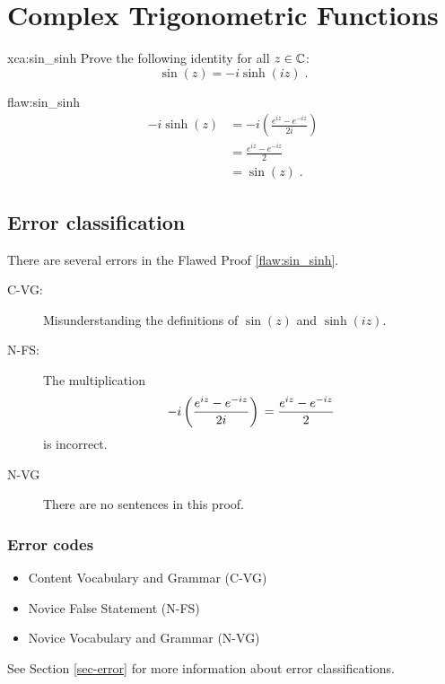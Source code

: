 \section{Complex Trigonometric Functions}

\begin{xca}{xca:sin_sinh}
Prove the following identity for all $z \in \mathbb C$: $$\sin(z) = -i\sinh(iz)\;.$$
\end{xca}

\begin{flaw}{flaw:sin_sinh} %
\begin{align*}
    -i\sinh(z) &= -i\left(\frac{e^{iz}-e^{-iz}}{2i}\right) \\
    &=  \frac{e^{iz}-e^{-iz}}{2} \\
    &= \sin(z)\;.
\end{align*}
\end{flaw}

\clearpage
\subsection{Error classification}


There are several errors
 in the Flawed Proof \ref{flaw:sin_sinh}. %


 \begin{description}
    \item[C-VG:] Misunderstanding the definitions of $\sin(z)$ and $\sinh(iz)$.
 \item[N-FS:] The multiplication $$-i\left(\frac{e^{iz}-e^{-iz}}{2i}\right) \\
    =  \frac{e^{iz}-e^{-iz}}{2}$$
    is incorrect.
 \item[N-VG] There are no sentences in this proof.
 \end{description}


\subsubsection{Error codes}
\begin{itemize}
	\item   Content Vocabulary and Grammar (C-VG)
	\item 	Novice False Statement (N-FS)
    \item Novice Vocabulary and Grammar (N-VG)
\end{itemize}
See Section \ref{sec-error} for more information about error classifications.

